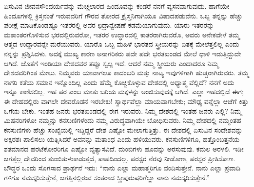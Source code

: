 ಏಸುವಿನ ಜೀವನಸೌಂದರ್ಯವನ್ನು ಮೆಚ್ಚಲಾರದ ಹಿಂದೂವನ್ನು ಕಂಡರೆ ನನಗೆ ವ್ಯಸನವಾಗುವುದು. ಹಾಗೆಯೇ ಹಿಂದೂಗಳಲ್ಲಿ ಕ್ರಿಸ್ತನಂತೆ ಇರುವವರಿಗೆ ಗೌರವ ತೋರದ ಕ್ರೈಸ್ತನಿಗಾಗಿಯೂ ವಿಷಾದಪಡುವೆನು. ಒಬ್ಬ ತನ್ನನ್ನು ಹೆಚ್ಚು ಪರೀಕ್ಷೆ ಮಾಡಿಕೊಂಡಷ್ಟೂ ಇತರರಲ್ಲಿ ಅವರ ಛಿದ್ರಾನ್ವೇಷಣೆ ಕಡಮೆಯಾಗುವುದು. ಯಾರು ಇತರರನ್ನು ಮತಾಂತರಗೊಳಿಸುವ ಭರದಲ್ಲಿರುವರೋ, ಇತರರ ಉದ್ಧಾರದಲ್ಲಿ ಕಾತರರಾಗಿರುವರೊ, ಅವರು ಅನೇಕವೇಳೆ ತಮ್ಮ ಆತ್ಮದ ಉದ್ಧಾರವನ್ನೇ ಮರೆಯುವರು. ಯಾರೊ ಒಬ್ಬ ಮಹಿಳೆ ಭಾರತದ ಸ್ತ್ರೀಯರನ್ನು ಏತಕ್ಕೆ ಮೇಲೆತ್ತಲಿಲ್ಲ ಎಂದು ನನ್ನನ್ನು ಪ್ರಶ್ನಿಸಿದಳು. ಅದಕ್ಕೆ ಮುಖ್ಯ ಕಾರಣ ಅನಾಗರಿಕರು ಪದೇ ಪದೇ ಭರತಖಂಡದ ಮೇಲೆ ಧಾಳಿ ಇಡುತ್ತಿದ್ದುದೇ ಆಗಿದೆ. ಜೊತೆಗೆ ಇಂಡಿಯಾ ದೇಶದವರ ತಪ್ಪೂ ಸ್ವಲ್ಪ ಇದೆ. ಆದರೆ ನಮ್ಮ ಸ್ತ್ರೀಯರು ಎಂದಾದರೂ ನಿಮ್ಮ ದೇಶದವರಿಗಿಂತ ಮೇಲು. ನಿಮ್ಮವರು ಯಾವಾಗಲೂ ಕಾದಂಬರಿ ಮತ್ತು ನಾಟ್ಯ ಇವುಗಳಿಗಾಗಿ ಹುಚ್ಚರಾಗಿರುವರು. ತಮ್ಮ ನಾಗರಿ ಕತೆಯ ಸಮಾನ ಇನ್ನೊಂದಿಲ್ಲ ಎಂದು ಹೆಮ್ಮೆ ಕೊಚ್ಚಿಕೊಳ್ಳುವ ದೇಶದಲ್ಲಿ ಅಧ್ಯಾತ್ಮ ವೆಲ್ಲಿದೆ? ನನಗೆ ಅದು ಇನ್ನೂ ಕಾಣಿಸಲಿಲ್ಲ. ಇಹ ಪರ ಎಂಬ ಮಾತು ಬರಿಯ ಮಕ್ಕಳನ್ನು ಅಂಜಿಸುವುದಕ್ಕೆ ಆಗಿದೆ. ಎಲ್ಲಾ ಇಹದಲ್ಲಿದೆ ಈಗ; ಈ ದೇಹದಲ್ಲಿರು ವಾಗಲೇ ದೇವರೊಡನೆ ಇರಬೇಕು! ಸ್ವಾರ್ಥವೆಲ್ಲಾ ಮಾಯವಾಗಬೇಕು; ಮೌಢ್ಯ ವನ್ನೆಲ್ಲಾ ಆಚೆಗೆ ಕಿತ್ತು ಒಗೆಯ ಬೇಕು. ಇಂತಹ ಜನರು ಭರತಖಂಡದಲ್ಲಿ ಈಗ ಇರುವರು. ನಿಮ್ಮ ದೇಶದಲ್ಲಿ ಇಂತಹ ಜನರು ಎಲ್ಲಿ? ನಿಮ್ಮ ಮಿಷನರಿಗಳೋ ನಮ್ಮನ್ನು ಕನಸುಣಿಗಳೆಂದು ನಮ್ಮ ವಿರುದ್ಧವಾಗಿಯೇ ಬೋಧಿಸುವರು. ನಿಮ್ಮ ದೇಶದಲ್ಲಿ ನಮ್ಮಂತಹ ಕನಸುಣಿಗಳು ಹೆಚ್ಚು ಸಂಖ್ಯೆಯಲ್ಲಿ ಇದ್ದಿದ್ದರೆ ದೇಶ ಎಷ್ಟೋ ಮೇಲಾಗುತ್ತಿತ್ತು. ಈ ದೇಶದಲ್ಲಿ ಏಸುವಿನ ಸಂದೇಶವನ್ನು ಅಕ್ಷರಶಃ ಪಾಲಿಸಲು ಯತ್ನಿಸಿದರೆ ಅವನನ್ನು ಮತಾಂಧ ಎಂದು ಹಳಿಯುವರು. ಕನಸುಣಿಗಳಿಗೂ, ಹತ್ತೊಂಬತ್ತನೆಯ ಶತಮಾನದ ಹರಟೆಕೋರರಿಗೂ ಎಷ್ಟೋ ವ್ಯತ್ಯಾಸವಿದೆ. ದುಂಬಿಗಳು ಹೂವನ್ನು ಅರಸುವುವು. ಕಮಲ ಅರಳಲಿ. ಇಡೀ ಜಗತ್ತೆಲ್ಲ ದೇವರಿಂದ ತುಂಬಿತುಳುಕಾಡುತ್ತದೆ, ಪಾಪದಿಂದಲ್ಲ. ಪರಸ್ಪರ ನೆರವು ನೀಡೋಣ, ಪರಸ್ಪರ ಪ್ರೀತಿಸೋಣ. ಬೌದ್ಧರ ಒಂದು ಸೊಗಸಾದ ಪ್ರಾರ್ಥನೆ ಇದು: “ನಾನು ಎಲ್ಲಾ ಮಹಾತ್ಮರಿಗೂ ವಂದಿಸುತ್ತೇನೆ. ನಾನು ಎಲ್ಲಾ ಪ್ರವಾದಿ ಗಳಿಗೂ ನಮಸ್ಕರಿಸುತ್ತೇನೆ, ಜಗತ್ತಿನಲ್ಲಿರುವ ಸಂತರಾದ ಸ್ತ್ರೀಪುರುಷರಿಗೆಲ್ಲಾ ನಾನು ನಮಸ್ಕರಿಸುತ್ತೇನೆ.”

